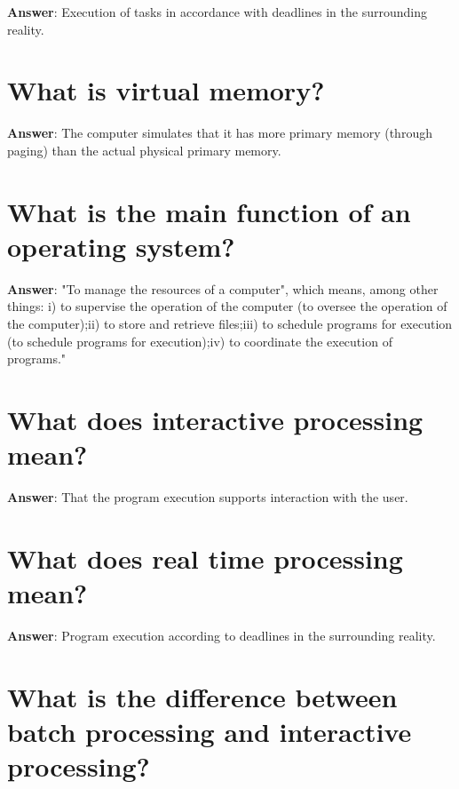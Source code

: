 \documentclass[a4paper,11pt,oneside]{book}
\begin{document}
\begin{sloppypar}
\label{q:106:sa:en:True}

\textbf{Answer}: Execution of tasks in accordance with deadlines in the surrounding reality.



\section{What is virtual memory?}

\label{q:108:sa:en:True}

\textbf{Answer}: The computer simulates that it has more primary memory (through paging) than the actual physical primary memory.



\section{What is the main function of an operating system?}

\label{q:109:sa:en:True}

\textbf{Answer}: "To manage the resources of a computer", which means, among other things: i) to supervise the operation of the computer (to oversee the operation of the computer);ii) to store and retrieve files;iii) to schedule programs for execution (to schedule programs for execution);iv) to coordinate the execution of programs."



\section{What does interactive processing mean?}

\label{q:110:sa:en:True}

\textbf{Answer}: That the program execution supports interaction with the user.



\section{What does real time processing mean?}

\label{q:111:sa:en:True}

\textbf{Answer}: Program execution according to deadlines in the surrounding reality.



\section{What is the difference between batch processing and interactive processing?}


\end{sloppypar}
\end{document}
